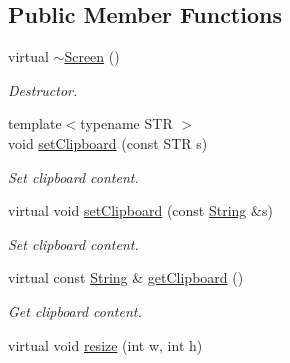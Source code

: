 \subsection*{Public Member Functions}
\begin{DoxyCompactItemize}
\item 
\hypertarget{classGUI_1_1Screen_a28790d016f26b151f43bac29a08bea12}{virtual \hyperlink{classGUI_1_1Screen_a28790d016f26b151f43bac29a08bea12}{$\sim$\-Screen} ()}\label{classGUI_1_1Screen_a28790d016f26b151f43bac29a08bea12}

\begin{DoxyCompactList}\small\item\em Destructor. \end{DoxyCompactList}\item 
\hypertarget{classGUI_1_1Screen_ab2f5439bc43c1738495bc4f8431989ae}{{\footnotesize template$<$typename S\-T\-R $>$ }\\void \hyperlink{classGUI_1_1Screen_ab2f5439bc43c1738495bc4f8431989ae}{set\-Clipboard} (const S\-T\-R s)}\label{classGUI_1_1Screen_ab2f5439bc43c1738495bc4f8431989ae}

\begin{DoxyCompactList}\small\item\em Set clipboard content. \end{DoxyCompactList}\item 
\hypertarget{classGUI_1_1Screen_a1fff320ba670a6bb14f4a0953e8e0b4b}{virtual void \hyperlink{classGUI_1_1Screen_a1fff320ba670a6bb14f4a0953e8e0b4b}{set\-Clipboard} (const \hyperlink{classGUI_1_1String}{String} \&s)}\label{classGUI_1_1Screen_a1fff320ba670a6bb14f4a0953e8e0b4b}

\begin{DoxyCompactList}\small\item\em Set clipboard content. \end{DoxyCompactList}\item 
\hypertarget{classGUI_1_1Screen_abf7520d6b898a331ea8114a197306f84}{virtual const \hyperlink{classGUI_1_1String}{String} \& \hyperlink{classGUI_1_1Screen_abf7520d6b898a331ea8114a197306f84}{get\-Clipboard} ()}\label{classGUI_1_1Screen_abf7520d6b898a331ea8114a197306f84}

\begin{DoxyCompactList}\small\item\em Get clipboard content. \end{DoxyCompactList}\item 
\hypertarget{classGUI_1_1Screen_a01265259b3322e72d9e6a1707eb0bb51}{virtual void \hyperlink{classGUI_1_1Screen_a01265259b3322e72d9e6a1707eb0bb51}{resize} (int w, int h)}\label{classGUI_1_1Screen_a01265259b3322e72d9e6a1707eb0bb51}


\end{DoxyCompactItemize}
